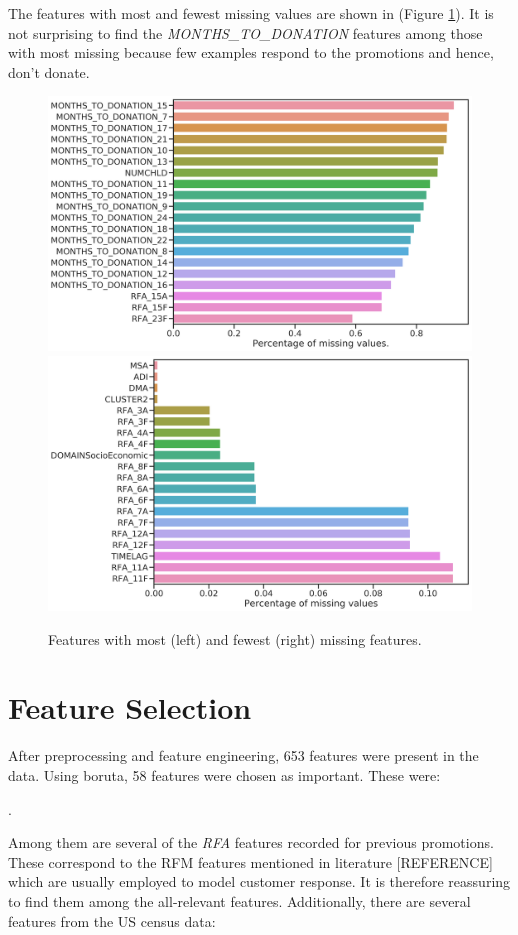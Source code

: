 \documentclass[
  11pt,
  a4paper,
  DIV=12,captions=tableheading,oneside,titlepage=firstiscover,abstracton]{scrreprt}
\begin{document}
The features with most and fewest missing values are shown in (Figure \ref{fig:most-fewest-missing}). It is not surprising to find the \emph{MONTHS\_TO\_DONATION} features among those with most missing because few examples respond to the promotions and hence, don't donate.



\begin{figure}

{\centering \includegraphics[width=0.49\linewidth]{figures/imputation/most-missing} \includegraphics[width=0.49\linewidth]{figures/imputation/fewest-missing} 

}

\caption{Features with most (left) and fewest (right) missing features.}\label{fig:most-fewest-missing}
\end{figure}

\hypertarget{feature-selection}{%
\section{Feature Selection}\label{feature-selection}}

After preprocessing and feature engineering, 653 features were present in the data. Using boruta, 58 features were chosen as important. These were:

.

Among them are several of the \emph{RFA} features recorded for previous promotions. These correspond to the RFM features mentioned in literature {[}REFERENCE{]} which are usually employed to model customer response. It is therefore reassuring to find them among the all-relevant features. Additionally, there are several features from the US census data:
\end{document}
